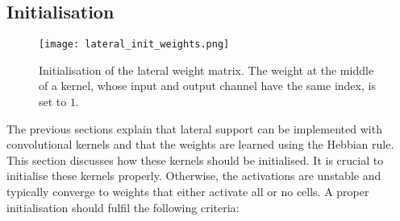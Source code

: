 

\subsection{Initialisation}
\begin{figure}[h]
    \centering
    \texttt{[image: lateral\_init\_weights.png]}
    \caption[Initialisation of the lateral weight matrix]{Initialisation of the lateral weight matrix. The weight at the middle of a kernel, whose input and output channel have the same index, is set to $1$.}
\end{figure}
The previous sections explain that lateral support can be implemented with convolutional kernels and that the weights are learned using the Hebbian rule.
This section discusses how these kernels should be initialised.
It is crucial to initialise these kernels properly. Otherwise, the activations are unstable and typically converge to weights that either activate all or no cells.
A proper initialisation should fulfil the following criteria:

